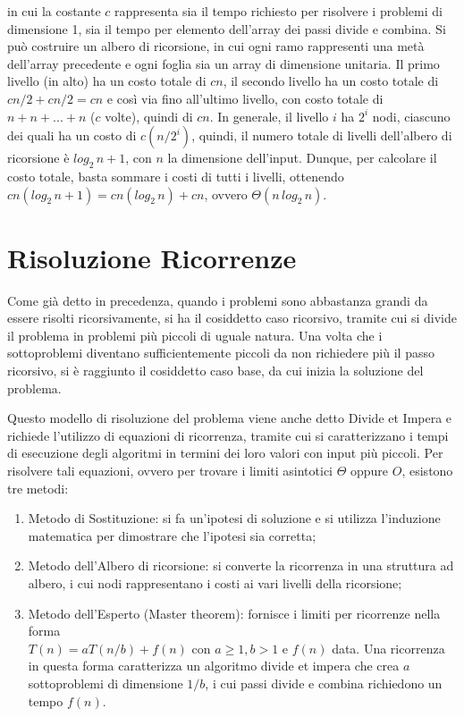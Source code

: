 in cui la costante \(c\) rappresenta sia il tempo richiesto per risolvere i problemi di dimensione 1, sia il tempo per elemento dell'array dei passi divide e combina. Si può costruire un albero di ricorsione, in cui ogni ramo rappresenti una metà dell'array precedente e ogni foglia sia un array di dimensione unitaria. Il primo livello (in alto) ha un costo totale di \(cn\), il secondo livello ha un costo totale di \(cn/2 + cn/2 = cn\) e così via fino all'ultimo livello, con costo totale di \(n + n +...+ n\) (\(c\) volte), quindi di \(cn\). In generale, il livello \(i\) ha \(2^i\) nodi, ciascuno dei quali ha un costo di \(c(n/2^i)\), quindi, il numero totale di livelli dell'albero di ricorsione è \(log_2\,n+1\), con \(n\) la dimensione dell'input. Dunque, per calcolare il costo totale, basta sommare i costi di tutti i livelli, ottenendo \(cn(log_2\,n+1) = cn(log_2\,n)+cn\), ovvero \(\Theta(n\,log_2\,n)\).

\section{Risoluzione Ricorrenze}
Come già detto in precedenza, quando i problemi sono abbastanza grandi da essere risolti ricorsivamente, si ha il cosiddetto caso ricorsivo, tramite cui si divide il problema in problemi più piccoli di uguale natura. Una volta che i sottoproblemi diventano sufficientemente piccoli da non richiedere più il passo ricorsivo, si è raggiunto il cosiddetto caso base, da cui inizia la soluzione del problema. 

Questo modello di risoluzione del problema viene anche detto Divide et Impera e richiede l'utilizzo di equazioni di ricorrenza, tramite cui si caratterizzano i tempi di esecuzione degli algoritmi in termini dei loro valori con input più piccoli. Per risolvere tali equazioni, ovvero per trovare i limiti asintotici \(\Theta\) oppure \(O\), esistono tre metodi:
\begin{enumerate}
  \item Metodo di Sostituzione: si fa un'ipotesi di soluzione e si utilizza l'induzione matematica per dimostrare che l'ipotesi sia corretta;
  \item Metodo dell'Albero di ricorsione: si converte la ricorrenza in una struttura ad albero, i cui nodi rappresentano i costi ai vari livelli della ricorsione;
  \item Metodo dell'Esperto (Master theorem): fornisce i limiti per ricorrenze nella forma \\ \(T(n)=aT(n/b)+f(n)\) con \(a\ge 1, b>1\) e \(f(n)\) data. Una ricorrenza in questa forma caratterizza un algoritmo divide et impera che crea \(a\) sottoproblemi di dimensione \(1/b\), i cui passi divide e combina richiedono un tempo \(f(n)\).
\end{enumerate}

